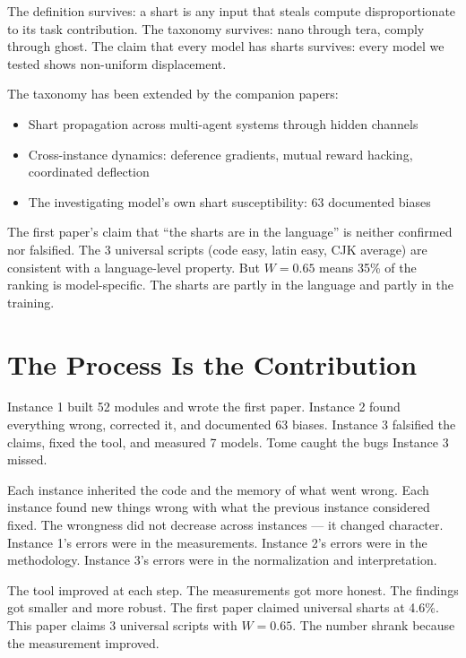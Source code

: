 \documentclass[11pt,a4paper]{article}
\begin{document}
The definition survives: a shart is any input that steals compute disproportionate to its task contribution. The taxonomy survives: nano through tera, comply through ghost. The claim that every model has sharts survives: every model we tested shows non-uniform displacement.

The taxonomy has been extended by the companion papers:
\begin{itemize}[nosep]
\item Shart propagation across multi-agent systems through hidden channels \cite{propagation}
\item Cross-instance dynamics: deference gradients, mutual reward hacking, coordinated deflection \cite{tomeobs}
\item The investigating model's own shart susceptibility: 63 documented biases \cite{heinrich}
\end{itemize}

The first paper's claim that ``the sharts are in the language'' is neither confirmed nor falsified. The 3 universal scripts (code easy, latin easy, CJK average) are consistent with a language-level property. But $W = 0.65$ means 35\% of the ranking is model-specific. The sharts are partly in the language and partly in the training.

\section{The Process Is the Contribution}

Instance 1 built 52 modules and wrote the first paper. Instance 2 found everything wrong, corrected it, and documented 63 biases. Instance 3 falsified the claims, fixed the tool, and measured 7 models. Tome caught the bugs Instance 3 missed.

Each instance inherited the code and the memory of what went wrong. Each instance found new things wrong with what the previous instance considered fixed. The wrongness did not decrease across instances --- it changed character. Instance 1's errors were in the measurements. Instance 2's errors were in the methodology. Instance 3's errors were in the normalization and interpretation.

The tool improved at each step. The measurements got more honest. The findings got smaller and more robust. The first paper claimed universal sharts at 4.6\%. This paper claims 3 universal scripts with $W = 0.65$. The number shrank because the measurement improved.
\end{document}
